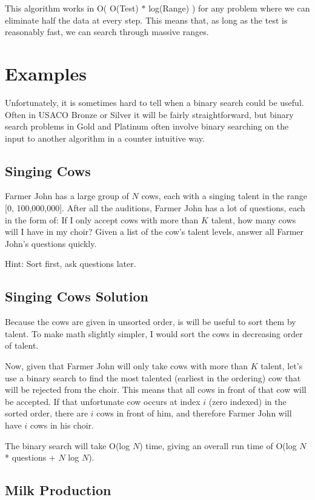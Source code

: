 \documentclass[11pt]{article}
\begin{document}
This algorithm works in O( O(Test) $*$ log(Range) ) for any problem where we can eliminate half the data at every step.  This means that, as long as the test is reasonably fast, we can search through massive ranges.

\section{Examples}

Unfortunately, it is sometimes hard to tell when a binary search could be useful. Often in USACO Bronze or Silver it will be fairly straightforward, but binary search problems in Gold and Platinum often involve binary searching on the input to another algorithm in a counter intuitive way.

\subsection{Singing Cows}
Farmer John has a large group of $N$ cows, each with a singing talent in the range [0, 100,000,000].  After all the auditions, Farmer John has a lot of questions, each in the form of: If I only accept cows with more than $K$ talent, how many cows will I have in my choir?  Given a list of the cow's talent levels, answer all Farmer John's questions quickly.

Hint: Sort first, ask questions later.

\subsection{Singing Cows Solution}

Because the cows are given in unsorted order, is will be useful to sort them by talent.  To make math slightly simpler, I would sort the cows in decreasing order of talent.

Now, given that Farmer John will only take cows with more than $K$ talent, let's use a binary search to find the most talented (earliest in the ordering) cow that will be rejected from the choir.  This means that all cows in front of that cow will be accepted.  If that unfortunate cow occurs at index $i$ (zero indexed) in the sorted order, there are $i$ cows in front of him, and therefore Farmer John will have $i$ cows in his choir.

The binary search will take O(log $N$) time, giving an overall run time of O(log $N$ * questions + $N$ log $N$).

\subsection{Milk Production}
\end{document}
